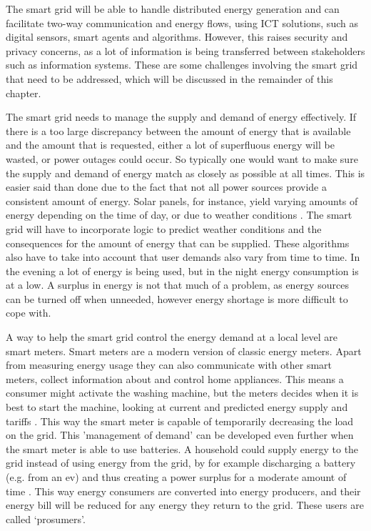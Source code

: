 The smart grid will be able to handle distributed energy generation and can facilitate two-way communication and energy flows, using ICT solutions, such as digital sensors, smart agents and algorithms. However, this raises security and privacy concerns, as a lot of information is being transferred between stakeholders such as information systems. These are some challenges involving the smart grid that need to be addressed, which will be discussed in the remainder of this chapter.

The smart grid needs to manage the supply and demand of energy effectively. If there is a too large discrepancy between the amount of energy that is available and the amount that is requested, either a lot of superfluous energy will be wasted, or power outages could occur. So typically one would want to make sure the supply and demand of energy match as closely as possible at all times. This is easier said than done due to the fact that not all power sources provide a consistent amount of energy. Solar panels, for instance, yield varying amounts of energy depending on the time of day, or due to weather conditions \cite{RamchurnVitelingumRogersJennings2014}. The smart grid will have to incorporate logic to predict weather conditions and the consequences for the amount of energy that can be supplied. These algorithms also have to take into account that user demands also vary from time to time. In the evening a lot of energy is being used, but in the night energy consumption is at a low. A surplus in energy is not that much of a problem, as energy sources can be turned off when unneeded, however energy shortage is more difficult to cope with.

A way to help the smart grid control the energy demand at a local level are smart meters. Smart meters are a modern version of classic energy meters. Apart from measuring energy usage they can also communicate with other smart meters, collect information about and control home appliances. This means a consumer might activate the washing machine, but the meters decides when it is best to start the machine, looking at current and predicted energy supply and tariffs  \cite{DepuruWangDevabhaktuni2011a}. This way the smart meter is capable of temporarily decreasing the load on the grid. This 'management of demand' can be developed even further when the smart meter is able to use batteries. A household could supply energy to the grid instead of using energy from the grid, by for example discharging a battery (e.g. from an \ac{ev}) and thus creating a power surplus for a moderate amount of time \cite{MwasiluJustoKimEtAl2014}. This way energy consumers are converted into energy producers, and their energy bill will be reduced for any energy they return to the grid. These users are called `prosumers'.

